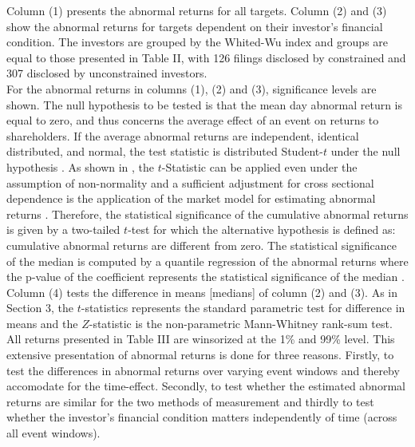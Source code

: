 \documentclass[12pt]{article}
\begin{document}
\noindent Column (1) presents the abnormal returns for all targets. Column (2) and (3) show the abnormal returns for targets dependent on their investor's financial condition. The investors are grouped by the Whited-Wu index and groups are equal to those presented in Table II, with 126 filings disclosed by constrained and 307 disclosed by unconstrained investors.\\
For the abnormal returns in columns (1), (2) and (3), significance levels are shown. The null hypothesis to be tested is that the mean day abnormal return is equal to zero, and thus concerns the average effect of an event on returns to shareholders. If the average abnormal returns are independent, identical distributed, and normal, the test statistic is distributed Student-$t$ under the null hypothesis \citep[p.7]{Brown1985}. As shown in \citet[p.11]{Brown1985}, the $t$-Statistic can be applied even under the assumption of non-normality and a sufficient adjustment for cross sectional dependence is the application of the market model for estimating abnormal returns \citep[p.22]{Brown1985}. Therefore, the statistical significance of the cumulative abnormal returns is given by a two-tailed $t$-test for which the alternative hypothesis is defined as: cumulative abnormal returns are different from zero. The statistical significance of the median is computed by a quantile regression of the abnormal returns where the p-value of the coefficient represents the statistical significance of the median \citep{Ucla}. Column (4) tests the difference in means [medians] of column (2) and (3). As in Section 3, the $t$-statistics represents the standard parametric test for difference in means and the $Z$-statistic is the non-parametric Mann-Whitney rank-sum test.
All returns  presented in Table III are winsorized at the 1\% and 99\% level. This extensive presentation of abnormal returns is done for three reasons. Firstly, to test the differences in abnormal returns over varying event windows and thereby accomodate for the time-effect. Secondly, to test whether the estimated abnormal returns are similar for the two methods of measurement and thirdly to test whether the investor's financial condition matters independently of time (across all event windows).
\end{document}
